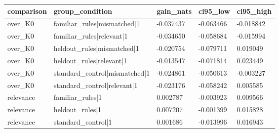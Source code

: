 \begin{tabular}{lllll}
\hline
comparison & group\_condition & gain\_nats & ci95\_low & ci95\_high \\
\hline
over\_K0 & familiar\_rules|mismatched|1 & -0.037437 & -0.063466 & -0.018842 \\
over\_K0 & familiar\_rules|relevant|1 & -0.034650 & -0.058684 & -0.015994 \\
over\_K0 & heldout\_rules|mismatched|1 & -0.020754 & -0.079711 & 0.019049 \\
over\_K0 & heldout\_rules|relevant|1 & -0.013547 & -0.071814 & 0.023449 \\
over\_K0 & standard\_control|mismatched|1 & -0.024861 & -0.050613 & -0.003227 \\
over\_K0 & standard\_control|relevant|1 & -0.023176 & -0.058242 & 0.005585 \\
relevance & familiar\_rules|1 & 0.002787 & -0.003923 & 0.009566 \\
relevance & heldout\_rules|1 & 0.007207 & -0.001399 & 0.015828 \\
relevance & standard\_control|1 & 0.001686 & -0.013996 & 0.016943 \\
\hline
\end{tabular}
